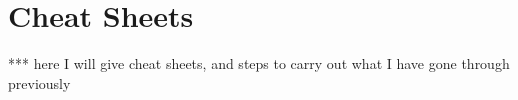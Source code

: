 \appendix
\chapter{Cheat Sheets}\label{ch: Cheat Sheets}

*** here I will give cheat sheets, and steps to carry out what I have gone through previously